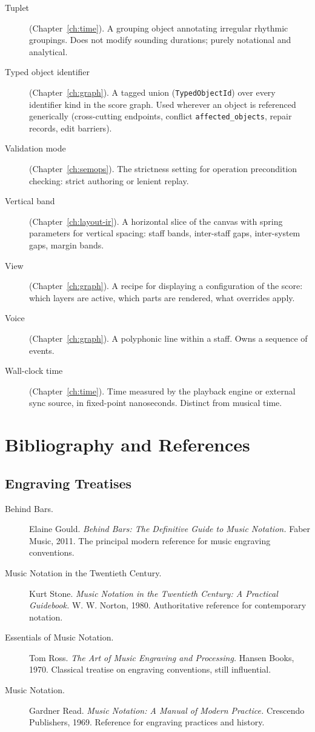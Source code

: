 \documentclass[11pt,letterpaper]{report}
\begin{document}
\begin{description}
  \item[Tuplet] (Chapter~\ref{ch:time}). A grouping object
    annotating irregular rhythmic groupings. Does not modify
    sounding durations; purely notational and analytical.
  \item[Typed object identifier]
    (Chapter~\ref{ch:graph}). A tagged union
    (\texttt{TypedObjectId}) over every identifier kind in the
    score graph. Used wherever an object is referenced
    generically (cross-cutting endpoints, conflict
    \texttt{affected\_objects}, repair records, edit barriers).
  \item[Validation mode] (Chapter~\ref{ch:semops}). The strictness
    setting for operation precondition checking: strict authoring
    or lenient replay.
  \item[Vertical band] (Chapter~\ref{ch:layout-ir}). A horizontal
    slice of the canvas with spring parameters for vertical
    spacing: staff bands, inter-staff gaps, inter-system gaps,
    margin bands.
  \item[View] (Chapter~\ref{ch:graph}). A recipe for displaying a
    configuration of the score: which layers are active, which
    parts are rendered, what overrides apply.
  \item[Voice] (Chapter~\ref{ch:graph}). A polyphonic line within
    a staff. Owns a sequence of events.
  \item[Wall-clock time] (Chapter~\ref{ch:time}). Time measured by
    the playback engine or external sync source, in fixed-point
    nanoseconds. Distinct from musical time.
\end{description}

\chapter{Bibliography and References}
\label{app:refs}

\section*{Engraving Treatises}

\begin{description}
  \item[Behind Bars.] Elaine Gould. \emph{Behind Bars: The Definitive
    Guide to Music Notation.} Faber Music, 2011. The principal
    modern reference for music engraving conventions.
  \item[Music Notation in the Twentieth Century.] Kurt Stone.
    \emph{Music Notation in the Twentieth Century: A Practical
    Guidebook.} W. W. Norton, 1980. Authoritative reference for
    contemporary notation.
  \item[Essentials of Music Notation.] Tom Ross. \emph{The Art of
    Music Engraving and Processing.} Hansen Books, 1970. Classical
    treatise on engraving conventions, still influential.
  \item[Music Notation.] Gardner Read. \emph{Music Notation: A
    Manual of Modern Practice.} Crescendo Publishers, 1969.
    Reference for engraving practices and history.
\end{description}
\end{document}

